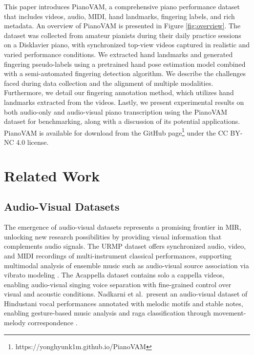 \documentclass{article}
\begin{document}
This paper introduces PianoVAM, a comprehensive piano performance dataset that includes videos, audio, MIDI, hand landmarks, fingering labels, and rich metadata. An overview of PianoVAM is presented in Figure \ref{fig:overview}. The dataset was collected from amateur pianists during their daily practice sessions on a Disklavier piano, with synchronized top-view videos captured in realistic and varied performance conditions. We extracted hand landmarks and generated fingering pseudo-labels using a pretrained hand pose estimation model combined with a semi-automated fingering detection algorithm.  We describe the challenges faced during data collection and the alignment of multiple modalities. Furthermore, we detail our fingering annotation method, which utilizes hand landmarks extracted from the videos. Lastly, we present experimental results on both audio-only and audio-visual piano transcription using the PianoVAM dataset for benchmarking, along with a discussion of its potential applications. PianoVAM is available for download from the GitHub page\footnote{https://yonghyunk1m.github.io/PianoVAM\label{github-link}} under the CC BY-NC 4.0 license.


\section{Related Work}
\subsection{Audio-Visual Datasets}
The emergence of audio-visual datasets represents a promising frontier in MIR, unlocking new research possibilities by providing visual information that complements audio signals. The URMP dataset \cite{TMM18Li} offers synchronized audio, video, and MIDI recordings of multi-instrument classical performances, supporting multimodal analysis of ensemble music such as audio-visual source association via vibrato modeling \cite{SMC17Li}. The Acappella dataset \cite{BMVC21Montesinos} contains solo a cappella videos, enabling audio-visual singing voice separation with fine-grained control over visual and acoustic conditions. Nadkarni et al.\ present an audio-visual dataset of Hindustani vocal performances annotated with melodic motifs and stable notes, enabling gesture-based music analysis and raga classification through movement-melody correspondence \cite{TISMIR24Nadkarni}.
\end{document}
